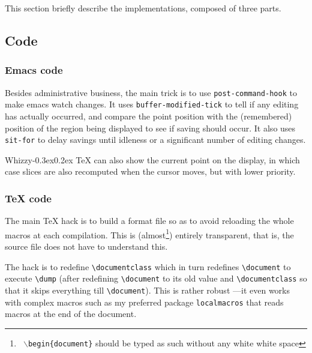 \documentclass{article}
\let \lst \verb
\def \whizzy{{Whizzy\kern -0.3ex\raise 0.2ex \hbox{\TeX}}}
\begin{document}
This section briefly describe the implementations, composed of three parts.

\subsection {Code} 

\subsubsection* {Emacs code}

Besides administrative business, the main trick is to use 
\lst"post-command-hook" to make emacs watch changes. 
It uses \lst"buffer-modified-tick" to tell if any editing has actually
occurred, and compare the point position with the (remembered) position of
the region being displayed to see if saving should occur. It also uses
\lst"sit-for" to delay savings until idleness or a 
significant number of editing changes. 

{\whizzy} can also show the current point on the display, in which case
slices are also recomputed when the cursor moves, but with lower priority.

\subsubsection* {TeX code}

The main TeX hack is to build a format file so as to avoid reloading the
whole macros at each compilation. This is (almost\footnote{{\tt
$\backslash$begin\{document\}} should be typed as such without any white
white space}) entirely transparent, that is, the source file does not have
to understand this.

The hack is to redefine \lst"\documentclass" which in turn  redefines
\lst"\document" to execute \lst"\dump" (after redefining \lst"\document"
to its old value and \lst"\documentclass" so that it skips everything till
\lst"\document"). This is rather robust ---it even works with 
complex macros such as my preferred package \lst"localmacros" that reads
macros at the end of the document.
\end{document}
